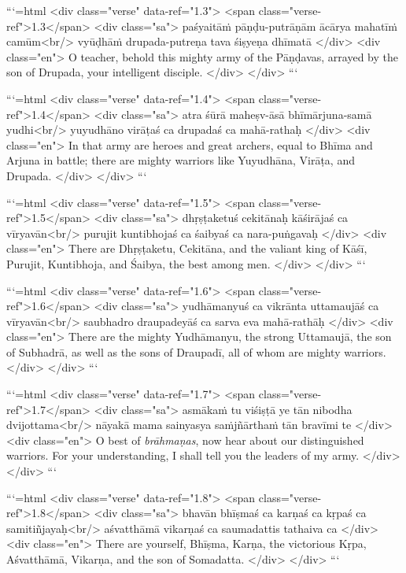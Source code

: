 ```{=html}
<div class="verse" data-ref="1.3">
  <span class="verse-ref">1.3</span>
  <div class="sa">
    paśyaitāṁ pāṇḍu-putrāṇām ācārya mahatīṁ camūm<br/>
    vyūḍhāṁ drupada-putreṇa tava śiṣyeṇa dhīmatā
  </div>
  <div class="en">
    O teacher, behold this mighty army of the Pāṇḍavas, arrayed by the son of Drupada, your intelligent disciple.
  </div>
</div>
```



```{=html}
<div class="verse" data-ref="1.4">
  <span class="verse-ref">1.4</span>
  <div class="sa">
    atra śūrā maheṣv-āsā bhīmārjuna-samā yudhi<br/>
    yuyudhāno virāṭaś ca drupadaś ca mahā-rathaḥ
  </div>
  <div class="en">
    In that army are heroes and great archers, equal to Bhīma and Arjuna in battle; there are mighty warriors like Yuyudhāna, Virāṭa, and Drupada.
  </div>
</div>
```



```{=html}
<div class="verse" data-ref="1.5">
  <span class="verse-ref">1.5</span>
  <div class="sa">
    dhṛṣṭaketuś cekitānaḥ kāśirājaś ca vīryavān<br/>
    purujit kuntibhojaś ca śaibyaś ca nara-puṅgavaḥ
  </div>
  <div class="en">
    There are Dhṛṣṭaketu, Cekitāna, and the valiant king of Kāśī, Purujit, Kuntibhoja, and Śaibya, the best among men.
  </div>
</div>
```



```{=html}
<div class="verse" data-ref="1.6">
  <span class="verse-ref">1.6</span>
  <div class="sa">
    yudhāmanyuś ca vikrānta uttamaujāś ca vīryavān<br/>
    saubhadro draupadeyāś ca sarva eva mahā-rathāḥ
  </div>
  <div class="en">
    There are the mighty Yudhāmanyu, the strong Uttamaujā, the son of Subhadrā, as well as the sons of Draupadī, all of whom are mighty warriors.
  </div>
</div>
```



```{=html}
<div class="verse" data-ref="1.7">
  <span class="verse-ref">1.7</span>
  <div class="sa">
    asmākaṁ tu viśiṣṭā ye tān nibodha dvijottama<br/>
    nāyakā mama sainyasya saṁjñārthaṁ tān bravīmi te
  </div>
  <div class="en">
    O best of \textit{brāhmaṇas}, now hear about our distinguished warriors. For your understanding, I shall tell you the leaders of my army.
  </div>
</div>
```



```{=html}
<div class="verse" data-ref="1.8">
  <span class="verse-ref">1.8</span>
  <div class="sa">
    bhavān bhīṣmaś ca karṇaś ca kṛpaś ca samitiñjayaḥ<br/>
    aśvatthāmā vikarṇaś ca saumadattis tathaiva ca
  </div>
  <div class="en">
    There are yourself, Bhīṣma, Karṇa, the victorious Kṛpa, Aśvatthāmā, Vikarṇa, and the son of Somadatta.
  </div>
</div>
```



